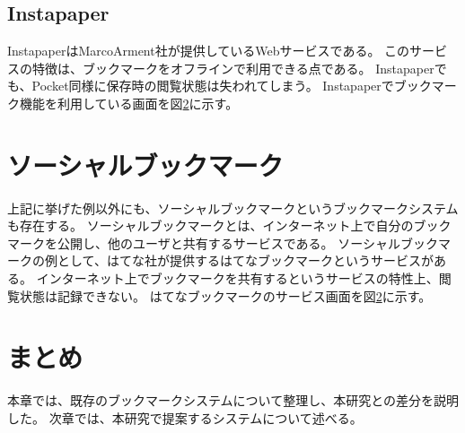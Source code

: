 \subsection{Instapaper}
InstapaperはMarcoArment社\cite{}が提供しているWebサービスである。
このサービスの特徴は、ブックマークをオフラインで利用できる点である。
Instapaperでも、Pocket同様に保存時の閲覧状態は失われてしまう。
Instapaperでブックマーク機能を利用している画面を図\ref{}に示す。

\section{ソーシャルブックマーク}
上記に挙げた例以外にも、ソーシャルブックマークというブックマークシステムも存在する。
ソーシャルブックマークとは、インターネット上で自分のブックマークを公開し、他のユーザと共有するサービスである\cite{}。
ソーシャルブックマークの例として、はてな社\cite{}が提供するはてなブックマーク\cite{}というサービスがある。
インターネット上でブックマークを共有するというサービスの特性上、閲覧状態は記録できない。
はてなブックマークのサービス画面を図\ref{}に示す。

\section{まとめ}
本章では、既存のブックマークシステムについて整理し、本研究との差分を説明した。
次章では、本研究で提案するシステムについて述べる。